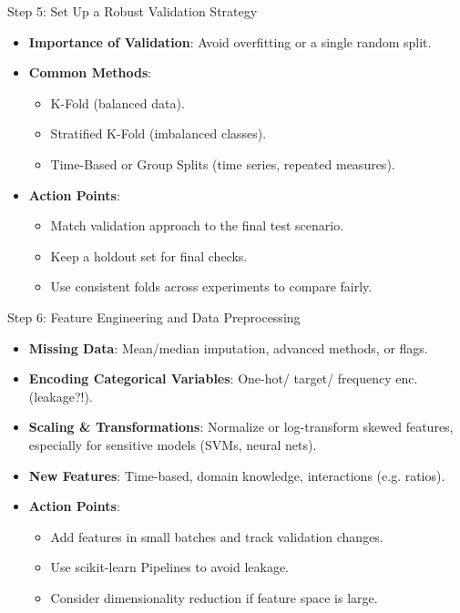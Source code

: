 \documentclass[ignorenonframetext,]{beamer}
\begin{document}
\begin{frame}{Step 5: Set Up a Robust Validation Strategy}
\begin{itemize}
  \item \textbf{Importance of Validation}: Avoid overfitting or a single random split.
  \item \textbf{Common Methods}:
    \begin{itemize}
      \item K-Fold (balanced data).
      \item Stratified K-Fold (imbalanced classes).
      \item Time-Based or Group Splits (time series, repeated measures).
    \end{itemize}
  \item \textbf{Action Points}:
    \begin{itemize}
      \item Match validation approach to the final test scenario.
      \item Keep a holdout set for final checks.
      \item Use consistent folds across experiments to compare fairly.
    \end{itemize}
\end{itemize}
\end{frame}

\begin{frame}{Step 6: Feature Engineering and Data Preprocessing}
\begin{itemize}
  \item \textbf{Missing Data}: Mean/median imputation, advanced methods, or flags.
  \item \textbf{Encoding Categorical Variables}: One-hot/ target/ frequency enc. (leakage?!).
  \item \textbf{Scaling \& Transformations}: Normalize or log-transform skewed features, especially for sensitive models (SVMs, neural nets).
  \item \textbf{New Features}: Time-based, domain knowledge, interactions (e.g. ratios).
  \item \textbf{Action Points}:
    \begin{itemize}
      \item Add features in small batches and track validation changes.
      \item Use scikit-learn Pipelines to avoid leakage.
      \item Consider dimensionality reduction if feature space is large.
    \end{itemize}
\end{itemize}
\end{frame}
\end{document}
